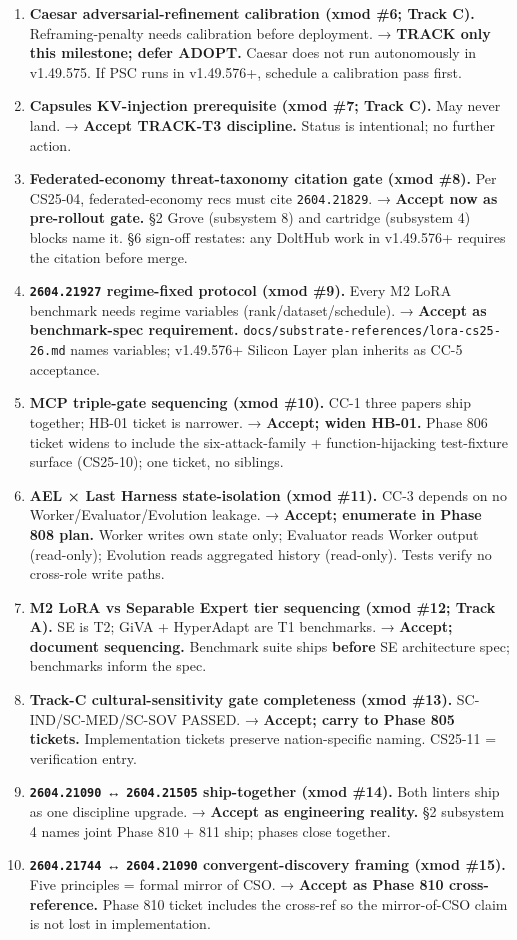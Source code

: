 \documentclass[11pt,letterpaper]{article}
\newcommand{\arxivid}[1]{\texttt{\textcolor{accent}{#1}}}
\begin{document}
\begin{enumerate}
\item
  \textbf{Caesar adversarial-refinement calibration (xmod \#6; Track
  C).} Reframing-penalty needs calibration before deployment. →
  \textbf{TRACK only this milestone; defer ADOPT.} Caesar does not run
  autonomously in v1.49.575. If PSC runs in v1.49.576+, schedule a
  calibration pass first.
\item
  \textbf{Capsules KV-injection prerequisite (xmod \#7; Track C).} May
  never land. → \textbf{Accept TRACK-T3 discipline.} Status is
  intentional; no further action.
\item
  \textbf{Federated-economy threat-taxonomy citation gate (xmod \#8).}
  Per CS25-04, federated-economy recs must cite \arxivid{2604.21829}. →
  \textbf{Accept now as pre-rollout gate.} §2 Grove (subsystem 8) and
  cartridge (subsystem 4) blocks name it. §6 sign-off restates: any
  DoltHub work in v1.49.576+ requires the citation before merge.
\item
  \textbf{\arxivid{2604.21927} regime-fixed protocol (xmod \#9).} Every
  M2 LoRA benchmark needs regime variables (rank/dataset/schedule). →
  \textbf{Accept as benchmark-spec requirement.}
  \texttt{docs/substrate-references/lora-cs25-26.md} names variables;
  v1.49.576+ Silicon Layer plan inherits as CC-5 acceptance.
\item
  \textbf{MCP triple-gate sequencing (xmod \#10).} CC-1 three papers
  ship together; HB-01 ticket is narrower. → \textbf{Accept; widen
  HB-01.} Phase 806 ticket widens to include the six-attack-family +
  function-hijacking test-fixture surface (CS25-10); one ticket, no
  siblings.
\item
  \textbf{AEL × Last Harness state-isolation (xmod \#11).} CC-3 depends
  on no Worker/Evaluator/Evolution leakage. → \textbf{Accept; enumerate
  in Phase 808 plan.} Worker writes own state only; Evaluator reads
  Worker output (read-only); Evolution reads aggregated history
  (read-only). Tests verify no cross-role write paths.
\item
  \textbf{M2 LoRA vs Separable Expert tier sequencing (xmod \#12; Track
  A).} SE is T2; GiVA + HyperAdapt are T1 benchmarks. → \textbf{Accept;
  document sequencing.} Benchmark suite ships \textbf{before} SE
  architecture spec; benchmarks inform the spec.
\item
  \textbf{Track-C cultural-sensitivity gate completeness (xmod \#13).}
  SC-IND/SC-MED/SC-SOV PASSED. → \textbf{Accept; carry to Phase 805
  tickets.} Implementation tickets preserve nation-specific naming.
  CS25-11 = verification entry.
\item
  \textbf{\arxivid{2604.21090} ↔ \arxivid{2604.21505} ship-together (xmod
  \#14).} Both linters ship as one discipline upgrade. → \textbf{Accept
  as engineering reality.} §2 subsystem 4 names joint Phase 810 + 811
  ship; phases close together.
\item
  \textbf{\arxivid{2604.21744} ↔ \arxivid{2604.21090} convergent-discovery
  framing (xmod \#15).} Five principles = formal mirror of CSO. →
  \textbf{Accept as Phase 810 cross-reference.} Phase 810 ticket
  includes the cross-ref so the mirror-of-CSO claim is not lost in
  implementation.
\end{enumerate}
\end{document}
